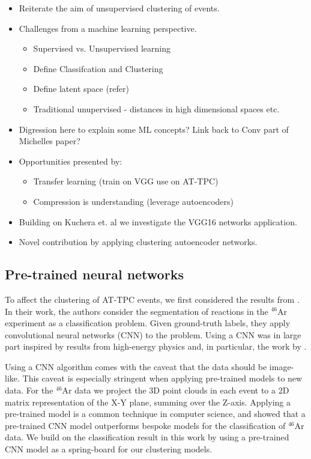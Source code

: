 \documentclass[preprint,12pt]{elsarticle}
\begin{document}
\begin{itemize}
    \item Reiterate the aim of unsupervised  clustering of events.
    \item Challenges from a machine learning perspective. 
    \begin{itemize}
        \item Supervised vs. Unsupervised learning
        \item Define Classifcation and Clustering 
        \item Define latent space (refer)
        \item Traditional unupervised - distances in high dimensional spaces etc. 
    \end{itemize}
    \item Digression here to explain some ML concepts? Link back to Conv part of Michelles paper? 
    \item Opportunities presented by: 
    \begin{itemize}
        \item Transfer learning (train on VGG use on AT-TPC)
        \item Compression is understanding (leverage autoencoders) 
    \end{itemize}
    \item Building on Kuchera et. al we investigate the VGG16 networks application. 
    \item Novel contribution by applying clustering autoencoder networks. 
\end{itemize}

\subsection{Pre-trained neural networks}

To affect the clustering of AT-TPC events, we first considered the results from \citet{Kuchera2019}. In their work, the authors consider the segmentation of reactions in the $^{46}$Ar experiment as a classification problem. Given ground-truth labels, they apply convolutional neural networks (CNN) to the problem. Using a CNN was in large part inspired by results from high-energy physics and, in particular, the work by \citet{Aurisano2016}. 

Using a CNN algorithm comes with the caveat that the data should be image-like. This caveat is especially stringent when applying pre-trained models to new data. For the $^{46}$Ar data we project the 3D point clouds in each event to a 2D matrix representation of the X-Y plane, summing over the Z-axis. Applying a pre-trained model is a common technique in computer science, and \citet{Kuchera2019} showed that a pre-trained CNN model outperforms bespoke models for the classification of $^{46}$Ar data. We build on the classification result in this work by using a pre-trained CNN model as a spring-board for our clustering models.
\end{document}
